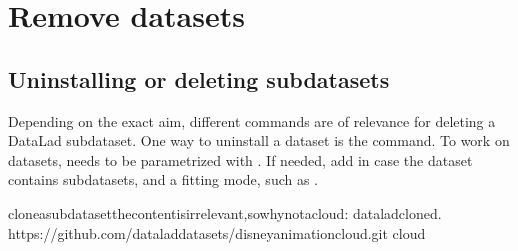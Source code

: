 \section{Remove datasets}
\label{\detokenize{basics/101-136-filesystem:remove-datasets}}
\ignorespaces 

\subsection{Uninstalling or deleting subdatasets}
\label{\detokenize{basics/101-136-filesystem:uninstalling-or-deleting-subdatasets}}\label{\detokenize{basics/101-136-filesystem:index-9}}
\sphinxAtStartPar
Depending on the exact aim, different commands are of relevance for
deleting a DataLad subdataset.
One way to uninstall a dataset is the  command.
To work on datasets,  needs to be parametrized with .
If needed, add  in case the dataset contains subdatasets, and a
fitting  mode, such as .

\begin{sphinxVerbatim}[commandchars=\\\{\}]
cloneasubdataset\PYGZhy{}thecontentisirrelevant,sowhynotacloud:
dataladclone\PYGZhy{}d.
https://github.com/datalad\PYGZhy{}datasets/disneyanimation\PYGZhy{}cloud.git
cloud
\end{sphinxVerbatim}

